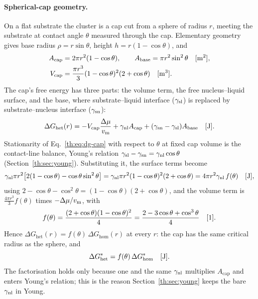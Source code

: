 \paragraph{Spherical-cap geometry.} On a flat substrate the cluster is a cap cut from a sphere of
radius $r$, meeting the substrate at contact angle $\theta$ measured through the cap. Elementary
geometry gives base radius $\rho=r\sin\theta$, height $h=r(1-\cos\theta)$, and
\begin{align}
A_\mathrm{cap}&=2\pi r^{2}(1-\cos\theta),\qquad A_\mathrm{base}=\pi r^{2}\sin^{2}\theta \quad[\mathrm{m^{2}}],\label{th:eq:cap-areas}\\
V_\mathrm{cap}&=\frac{\pi r^{3}}{3}(1-\cos\theta)^{2}(2+\cos\theta) \quad[\mathrm{m^{3}}].\label{th:eq:cap-volume}
\end{align}
The cap's free energy has three parts: the volume term, the free nucleus--liquid surface, and the
base, where substrate--liquid interface ($\gamma_\mathrm{sl}$) is replaced by substrate--nucleus interface
($\gamma_\mathrm{sn}$):
\begin{equation}\label{th:eq:dg-cap}
\Delta G_\mathrm{het}(r)=-V_\mathrm{cap}\frac{\Delta\mu}{v_\mathrm{m}}+\gamma_\mathrm{nl} A_\mathrm{cap}+(\gamma_\mathrm{sn}-\gamma_\mathrm{sl})A_\mathrm{base} \quad[\mathrm{J}].
\end{equation}
Stationarity of Eq.~\eqref{th:eq:dg-cap} with respect to $\theta$ at fixed cap volume is the
contact-line balance, Young's relation $\gamma_\mathrm{sl}-\gamma_\mathrm{sn}=\gamma_\mathrm{nl}\cos\theta$ (Section~\ref{th:sec:young}).
Substituting it, the surface terms become
\begin{equation}
\gamma_\mathrm{nl}\pi r^{2}\big[2(1-\cos\theta)-\cos\theta\sin^{2}\theta\big]
=\gamma_\mathrm{nl}\pi r^{2}(1-\cos\theta)^{2}(2+\cos\theta)=4\pi r^{2}\gamma_\mathrm{nl}\,f(\theta) \quad[\mathrm{J}],
\end{equation}
using $2-\cos\theta-\cos^{2}\theta=(1-\cos\theta)(2+\cos\theta)$, and the volume term is
$\frac{4\pi r^{3}}{3}f(\theta)$ times $-\Delta\mu/v_\mathrm{m}$, with
\begin{equation}\label{th:eq:f}
f(\theta)=\frac{(2+\cos\theta)(1-\cos\theta)^{2}}{4}=\frac{2-3\cos\theta+\cos^{3}\theta}{4} \quad[\mathrm{1}].
\end{equation}
Hence $\Delta G_\mathrm{het}(r)=f(\theta)\,\Delta G_\mathrm{hom}(r)$ at every $r$: the cap has the
same critical radius as the sphere, and
\begin{equation}\label{th:eq:het}
\Delta G^{*}_\mathrm{het}=f(\theta)\,\Delta G^{*}_\mathrm{hom} \quad[\mathrm{J}].
\end{equation}
The factorisation holds only because one and the same $\gamma_\mathrm{nl}$ multiplies $A_\mathrm{cap}$ and enters
Young's relation; this is the reason Section~\ref{th:sec:young} keeps the bare $\gamma_\mathrm{nl}$ in Young.

